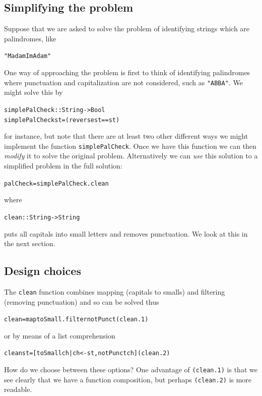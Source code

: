 \subsection*{Simplifying the problem}

Suppose that we are asked to solve the problem of identifying strings
which are palindromes, like
\begin{alltt}
"Madam Im Adam"
\end{alltt}
One way of approaching the problem is first to think of identifying
palindromes where punctuation and capitalization are not considered,
such as \texttt{"ABBA"}. We might solve this by
\begin{alltt}
simplePalCheck :: String -> Bool\label{simplePalCheck}
simplePalCheck st = (reverse st == st)
\end{alltt}
for instance, but note that there are at least two other different ways we might
implement the function \texttt{simplePalCheck}. Once we have this function we can
then {\em modify\/} it to solve the original problem. Alternatively we can {\em use\/} 
this solution to a simplified problem in the full solution:
\begin{alltt}
palCheck = simplePalCheck . clean
\end{alltt}
where
\begin{alltt}
clean :: String -> String
\end{alltt}
puts all capitals into small letters and removes punctuation. We look at this in the next section.

\subsection*{Design choices}

The \texttt{clean} function combines mapping (capitals to smalls) and
filtering (removing punctuation) and so can be solved thus
\begin{alltt}
clean = map toSmall . filter notPunct\hfill(clean.1)
\end{alltt}
or by means of a list comprehension
\begin{alltt}
clean st = [ toSmall ch | ch <- st , notPunct ch ]\hfill(clean.2)
\end{alltt}
How do we choose between these options? One advantage of
\texttt{(clean.1)} is that we see clearly that we have a function
composition, but perhaps \texttt{(clean.2)} is more readable.

